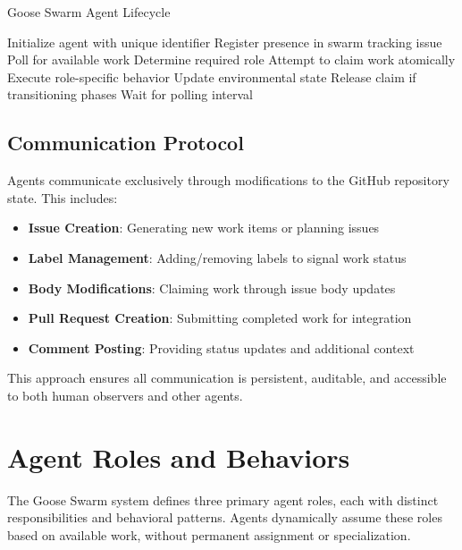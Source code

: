 \documentclass[11pt,a4paper]{article}
\begin{document}
\begin{algorithm}
\caption{Goose Swarm Agent Lifecycle}
\begin{algorithmic}[1]
\STATE Initialize agent with unique identifier
\STATE Register presence in swarm tracking issue
    \STATE Poll for available work
        \STATE Determine required role
        \STATE Attempt to claim work atomically
            \STATE Execute role-specific behavior
            \STATE Update environmental state
            \STATE Release claim if transitioning phases
        \ENDIF
    \ELSE
        \STATE Wait for polling interval
    \ENDIF
\ENDWHILE
\end{algorithmic}
\end{algorithm}

\subsection{Communication Protocol}

Agents communicate exclusively through modifications to the GitHub repository state. This includes:

\begin{itemize}
    \item \textbf{Issue Creation}: Generating new work items or planning issues
    \item \textbf{Label Management}: Adding/removing labels to signal work status
    \item \textbf{Body Modifications}: Claiming work through issue body updates
    \item \textbf{Pull Request Creation}: Submitting completed work for integration
    \item \textbf{Comment Posting}: Providing status updates and additional context
\end{itemize}

This approach ensures all communication is persistent, auditable, and accessible to both human observers and other agents.

\section{Agent Roles and Behaviors}

The Goose Swarm system defines three primary agent roles, each with distinct responsibilities and behavioral patterns. Agents dynamically assume these roles based on available work, without permanent assignment or specialization.
\end{document}

